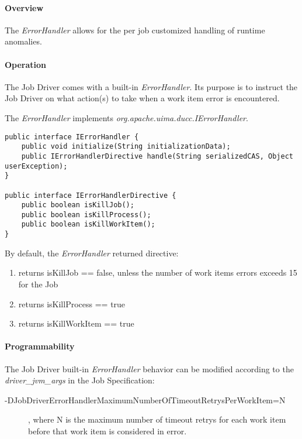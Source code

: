 \begin{sloppypar}
\paragraph {Overview} The {\em ErrorHandler} allows for the per job customized handling of runtime anomalies.

\paragraph {Operation} The Job Driver comes with a built-in {\em ErrorHandler}.  Its purpose is to 
instruct the Job Driver on what action(s) to take when a work item error is encountered.

The {\em ErrorHandler} implements {\em org.apache.uima.ducc.IErrorHandler}.

\begin{verbatim}
public interface IErrorHandler {
	public void initialize(String initializationData);
	public IErrorHandlerDirective handle(String serializedCAS, Object userException);
}

public interface IErrorHandlerDirective {
	public boolean isKillJob();
	public boolean isKillProcess();
	public boolean isKillWorkItem();
}
\end{verbatim}

By default, the {\em ErrorHandler} returned directive:
\begin{enumerate}
\item returns isKillJob == false, unless the number of work items errors exceeds 15 for the Job
\item returns isKillProcess == true
\item returns isKillWorkItem == true
\end{enumerate}

\paragraph {Programmability} The Job Driver built-in {\em ErrorHandler} behavior can be modified
according to the {\em driver\_jvm\_args} in the Job Specification:

\begin{description}
\item[-DJobDriverErrorHandlerMaximumNumberOfTimeoutRetrysPerWorkItem=N], where N is the maximum
number of timeout retrys for each work item before that work item is considered in error.
\end{description}


\end{sloppypar}
